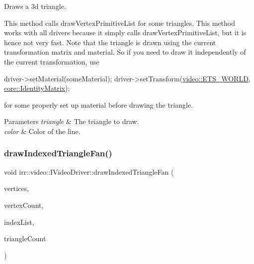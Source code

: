 Draws a 3d triangle. 

This method calls draw\+Vertex\+Primitive\+List for some triangles. This method works with all drivers because it simply calls draw\+Vertex\+Primitive\+List, but it is hence not very fast. Note that the triangle is drawn using the current transformation matrix and material. So if you need to draw it independently of the current transformation, use 
\begin{DoxyCode}
driver->setMaterial(someMaterial);
driver->setTransform(\hyperlink{namespaceirr_1_1video_a15b57657a320243be03ae6f66fcff43daf0d9765331daace35b8443c471738305}{video::ETS\_WORLD}, \hyperlink{namespaceirr_1_1core_ac4561f3920d3fbfbfff74c9bed1f2713}{core::IdentityMatrix});
\end{DoxyCode}
 for some properly set up material before drawing the triangle. 
\begin{DoxyParams}{Parameters}
{\em triangle} & The triangle to draw. \\
\hline
{\em color} & Color of the line. \\
\hline
\end{DoxyParams}
\mbox{\label{classirr_1_1video_1_1IVideoDriver_a8303b9a0f3e941d07d8cdc70c8fc1346}} 
\subsubsection{\texorpdfstring{draw\+Indexed\+Triangle\+Fan()}{drawIndexedTriangleFan()}\hspace{0.1cm}{\footnotesize\ttfamily [1/6]}}
{\footnotesize\ttfamily void irr\+::video\+::\+I\+Video\+Driver\+::draw\+Indexed\+Triangle\+Fan (\begin{DoxyParamCaption}\item[{const \hyperlink{structirr_1_1video_1_1S3DVertex}{S3\+D\+Vertex} $\ast$}]{vertices,  }\item[{\hyperlink{namespaceirr_a0416a53257075833e7002efd0a18e804}{u32}}]{vertex\+Count,  }\item[{const \hyperlink{namespaceirr_ae9f8ec82692ad3b83c21f555bfa70bcc}{u16} $\ast$}]{index\+List,  }\item[{\hyperlink{namespaceirr_a0416a53257075833e7002efd0a18e804}{u32}}]{triangle\+Count }\end{DoxyParamCaption})\hspace{0.3cm}{\ttfamily [inline]}}



